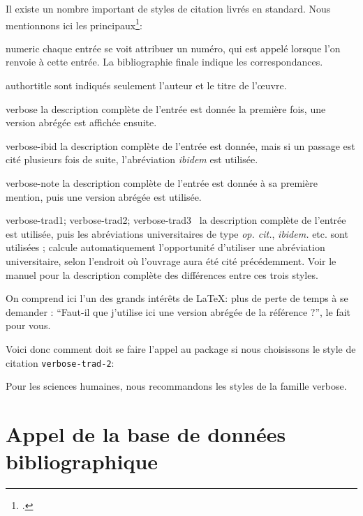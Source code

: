 Il existe un nombre important de styles de citation livrés en standard. Nous mentionnons ici les principaux\footcite[Se reporter pour plus de détails à][]{biblatex_style}:
\begin{choix}
\item[numeric]chaque entrée se voit attribuer un numéro, qui est appelé lorsque l'on renvoie à cette entrée. La bibliographie finale indique les correspondances.
\item[authortitle]sont indiqués seulement l'auteur et le titre de l'œuvre.
\item[verbose]la description complète de l'entrée est donnée la première fois, une version abrégée est affichée ensuite.
\item[verbose-ibid]la description complète de l'entrée est donnée, mais si un passage est cité plusieurs fois de suite, l'abréviation \emph{ibidem} est utilisée.
\item[verbose-note]la description complète de l'entrée est donnée à sa première mention, puis une version abrégée est utilisée.
\item[verbose-trad1; verbose-trad2; verbose-trad3]~la description complète de l'entrée est utilisée, puis les abréviations universitaires de type \emph{op. cit.}, \emph{ibidem.} etc. sont utilisées ;  calcule automatiquement l'opportunité d'utiliser une abréviation universitaire, selon l'endroit où l'ouvrage aura été cité précédemment. Voir le manuel pour la description complète des différences entre ces trois styles.
\end{choix}

On comprend ici l'un des grands intérêts de \LaTeX : plus de perte de temps à se demander : \enquote{Faut-il que j'utilise ici une version abrégée de la référence ?},  le fait pour vous.

Voici donc comment doit se faire l'appel au package si nous choisissons le style de citation \verb|verbose-trad-2|:

\begin{latexcode}
\usepackage[citestyle=verbose-trad2]{biblatex}
\end{latexcode}

Pour les sciences humaines, nous recommandons les styles de la famille verbose.


\section{Appel de la base de données bibliographique}


